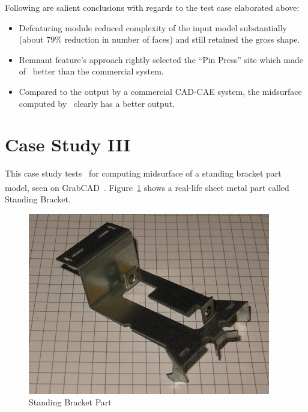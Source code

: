 
Following are salient conclusions with regards to the test case elaborated above:

\begin{itemize}[noitemsep,topsep=2pt,parsep=2pt,partopsep=2pt]
\item Defeaturing module reduced complexity of the input model substantially (about 79\% reduction in number of faces) and still retained the gross shape. 
\item Remnant feature's approach rightly selected the ``Pin Press'' site which made  of \mysystemname~better than the commercial system.
\item Compared to the output by a commercial CAD-CAE system, the midsurface computed by \mysystemname~clearly has a better output.
\end{itemize}



\section{Case Study III}

			
This case study tests \mysystemname~for computing midsurface of a standing bracket part model, seen on GrabCAD\textsuperscript{\textregistered}~\cite{grabcad}. Figure~\ref{fig:results:stdbracketpart} shows a real-life sheet metal part called Standing Bracket.


\begin{figure}[!h]
\centering     %
\includegraphics[width=0.62\linewidth,valign=t]{images/CommercialBracketReal}
\caption{Standing Bracket Part}
\label{fig:results:stdbracketpart}
\end{figure}

